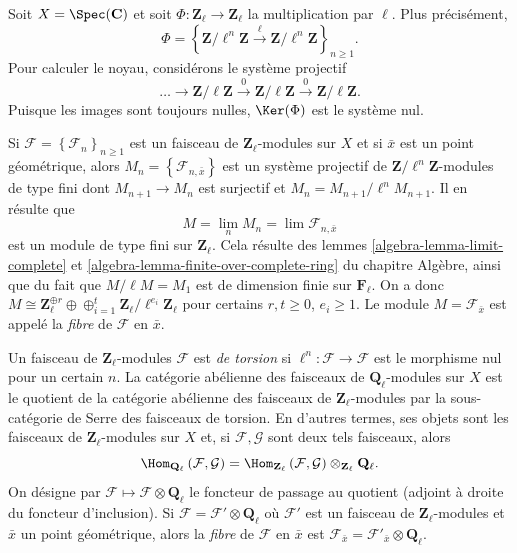 \begin{example}
\label{example-kernel}
Soit $X=\Spec(\mathbf{C})$ et soit $\Phi : \mathbf{Z}_\ell\to \mathbf{Z}_\ell$
la multiplication par $\ell$. Plus précisément,
$$
\Phi = \left\{ \mathbf{Z}/\ell^n\mathbf{Z} \xrightarrow{\ell}
\mathbf{Z}/\ell^n\mathbf{Z}\right\}_{n \geq 1}.
$$
Pour calculer le noyau, considérons le système projectif
$$
\ldots\to \mathbf{Z}/\ell\mathbf{Z}\xrightarrow{0}
\mathbf{Z}/\ell\mathbf{Z}\xrightarrow{0}\mathbf{Z}/\ell\mathbf{Z}.
$$
Puisque les images sont toujours nulles, $\Ker(\Phi)$ est le système nul.
\end{example}

\begin{remark}
\label{remark-stalk-l-adic-sheaf}
Si $\mathcal{F} = \left\{\mathcal{F}_n\right\}_{n\geq 1}$ est un
faisceau de $\mathbf{Z}_\ell$-modules sur $X$ et si $\bar x$ est un point géométrique, alors
$M_n = \left\{\mathcal{F}_{n, \bar x}\right\}$ est un système projectif de
$\mathbf{Z}/\ell^n\mathbf{Z}$-modules de type fini dont $M_{n+1}\to M_n$ est surjectif
et $M_n = M_{n+1}/\ell^n M_{n+1}$. Il en résulte que
$$
M = \lim_n M_n = \lim \mathcal{F}_{n, \bar x}
$$
est un module de type fini sur $\mathbf{Z}_\ell$. Cela résulte des
lemmes \ref{algebra-lemma-limit-complete} et
\ref{algebra-lemma-finite-over-complete-ring} du chapitre Algèbre, ainsi que du fait que
$M/\ell M = M_1$ est de dimension finie sur $\mathbf{F}_\ell$.
On a donc $M\cong \mathbf{Z}_\ell^{\oplus r} \oplus \oplus_{i = 1}^t
\mathbf{Z}_\ell/\ell^{e_i}\mathbf{Z}_\ell$ pour certains $r, t\geq 0$, $e_i\geq 1$.
Le module $M = \mathcal{F}_{\bar x}$ est appelé la {\it fibre} de
$\mathcal{F}$ en $\bar x$.
\end{remark}

\begin{definition}
\label{definition-torsion-l-adic-sheaf}
Un faisceau de $\mathbf{Z}_\ell$-modules $\mathcal{F}$ est {\it de torsion} si
$\ell^n : \mathcal{F} \to \mathcal{F}$ est le morphisme nul pour un certain $n$.
La catégorie abélienne
des faisceaux de $\mathbf{Q}_\ell$-modules sur $X$ est le quotient de la catégorie abélienne des
faisceaux de $\mathbf{Z}_\ell$-modules par la sous-catégorie de Serre des faisceaux de torsion. En
d'autres termes, ses objets sont les faisceaux de $\mathbf{Z}_\ell$-modules sur $X$ et, si
$\mathcal{F}, \mathcal{G}$ sont deux tels faisceaux, alors
$$
\Hom_{\mathbf{Q}_\ell} \left(\mathcal{F}, \mathcal{G} \right) =
\Hom_{\mathbf{Z}_\ell} \left(\mathcal{F}, \mathcal{G}\right)
\otimes_{\mathbf{Z}_\ell} \mathbf{Q}_\ell.
$$
On désigne par $\mathcal{F} \mapsto \mathcal{F} \otimes \mathbf{Q}_\ell$ le
foncteur de passage au quotient (adjoint à droite du foncteur d'inclusion). Si $\mathcal{F} =
\mathcal{F}' \otimes \mathbf{Q}_\ell$ où $\mathcal{F}'$ est un
faisceau de $\mathbf{Z}_\ell$-modules et $\bar x$ un point géométrique, alors la
{\it fibre} de $\mathcal{F}$ en $\bar x$ est $\mathcal{F}_{\bar x} =
\mathcal{F}'_{\bar x} \otimes \mathbf{Q}_\ell$.
\end{definition}

